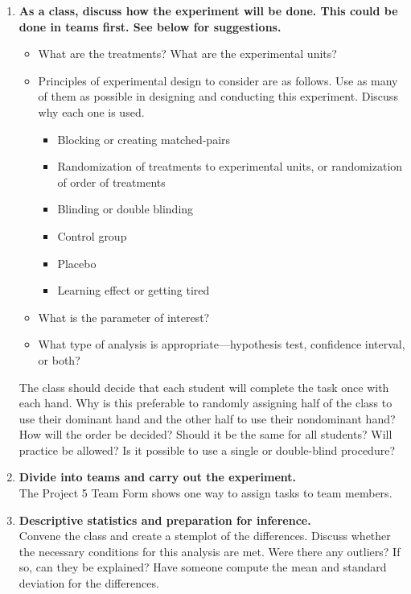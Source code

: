 \documentclass[twoside,openany]{tufte-book}
\begin{document}
\renewcommand{\labelenumi}{\textbf{Step \arabic{enumi}:}}
\begin{enumerate}[leftmargin=*, itemsep=.2em]
\item \textbf{As a class, discuss how the experiment will be done. This could be done in teams first. See below for suggestions.}

	\renewcommand{\labelitemi}{$\filledsquare$}
 	 \renewcommand{\labelitemii}{$\closedsucc$}
	\begin{itemize}  
	\item What are the treatments? What are the experimental units?
	\item Principles of experimental design to consider are as follows. Use as many of them as possible in designing and conducting this experiment. Discuss why each one is used.
		\begin{itemize}[leftmargin=1cm, itemsep=.2em]
		\item Blocking or creating matched-pairs
		\item Randomization of treatments to experimental units, or randomization of order of treatments
		\item Blinding or double blinding
		\item Control group
		\item Placebo
		\item Learning effect or getting tired
		\end{itemize}
	\item What is the parameter of interest?
	\item What type of analysis is appropriate---hypothesis test, confidence interval, or both?
	\end{itemize}
\renewcommand{\labelenumi}{\textbf{Step \arabic{enumi}:}}

The class should decide that each student will complete the task once with each hand. Why is this preferable to randomly assigning half of the class to use their dominant hand and the other half to use their nondominant hand? How will the order be decided? Should it be the same for all students? Will practice be allowed? Is it possible to use a single or double-blind procedure?

\item \textbf{Divide into teams and carry out the experiment.} \\
The Project 5 Team Form shows one way to assign tasks to team members. 

\item \textbf{Descriptive statistics and preparation for inference.} \\
Convene the class and create a stemplot of the differences. Discuss whether the necessary conditions for this analysis are met. Were there any outliers? If so, can they be explained? Have someone compute the mean and standard deviation for the differences.


\end{enumerate}
\end{document}
